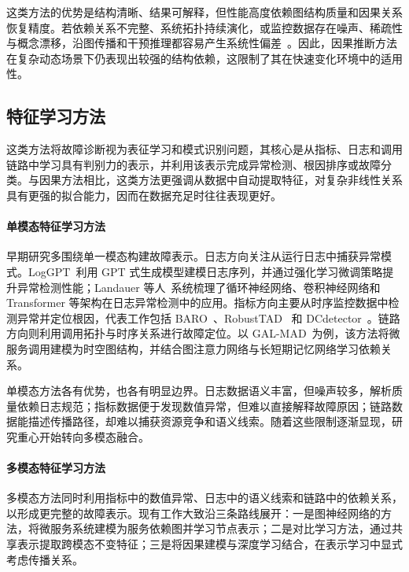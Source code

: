 这类方法的优势是结构清晰、结果可解释，但性能高度依赖图结构质量和因果关系恢复精度。若依赖关系不完整、系统拓扑持续演化，或监控数据存在噪声、稀疏性与概念漂移，沿图传播和干预推理都容易产生系统性偏差~\cite{pham2024causalmicroservicesurvey}。因此，因果推断方法在复杂动态场景下仍表现出较强的结构依赖，这限制了其在快速变化环境中的适用性。

\subsection{特征学习方法}

这类方法将故障诊断视为表征学习和模式识别问题，其核心是从指标、日志和调用链路中学习具有判别力的表示，并利用该表示完成异常检测、根因排序或故障分类。与因果方法相比，这类方法更强调从数据中自动提取特征，对复杂非线性关系具有更强的拟合能力，因而在数据充足时往往表现更好。

\paragraph{单模态特征学习方法}

早期研究多围绕单一模态构建故障表示。日志方向关注从运行日志中捕获异常模式。LogGPT~\cite{loggpt}利用 GPT 式生成模型建模日志序列，并通过强化学习微调策略提升异常检测性能；Landauer 等人~\cite{deep-learning-log-survey}系统梳理了循环神经网络、卷积神经网络和 Transformer 等架构在日志异常检测中的应用。指标方向主要从时序监控数据中检测异常并定位根因，代表工作包括 BARO~\cite{baro-rca}、RobustTAD~\cite{robusttad} 和 DCdetector~\cite{dcdetector}。链路方向则利用调用拓扑与时序关系进行故障定位。以 GAL-MAD~\cite{gal-mad}为例，该方法将微服务调用建模为时空图结构，并结合图注意力网络与长短期记忆网络学习依赖关系。

单模态方法各有优势，也各有明显边界。日志数据语义丰富，但噪声较多，解析质量依赖日志规范；指标数据便于发现数值异常，但难以直接解释故障原因；链路数据能描述传播路径，却难以捕获资源竞争和语义线索。随着这些限制逐渐显现，研究重心开始转向多模态融合。

\paragraph{多模态特征学习方法}

多模态方法同时利用指标中的数值异常、日志中的语义线索和链路中的依赖关系，以形成更完整的故障表示。现有工作大致沿三条路线展开：一是图神经网络的方法，将微服务系统建模为服务依赖图并学习节点表示；二是对比学习方法，通过共享表示提取跨模态不变特征；三是将因果建模与深度学习结合，在表示学习中显式考虑传播关系。

